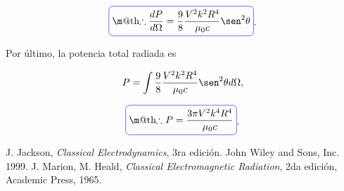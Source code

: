 \documentclass[a4paper,11pt]{article}
\makeatletter
\numberwithin{equation}{section}
\newcommand*{\boxcolor}{blue}
\renewcommand{\boxed}[1]{\textcolor{\boxcolor}{%
\tikz[baseline={([yshift=-1ex]current bounding box.center)}] \node [rectangle, minimum width=1ex,rounded corners,draw] {\normalcolor\m@th$\displaystyle#1$};}}
\makeatother
\begin{document}
\begin{equation}
 \boxed{\therefore \frac{dP}{d\Omega} = \frac{9}{8}\frac{V^2k^2R^4}{\mu_0c}
 \sen^2{\theta}}.
\end{equation}

Por último, la potencia total radiada es 

\begin{equation}
 P = \int  \frac{9}{8}\frac{V^2k^2R^4}{\mu_0c} \sen^2{\theta} d\Omega,
\end{equation}

\begin{equation}
 \boxed{\therefore P = \frac{3\pi V^2 k^4 R^4}{\mu_0 c}}.
\end{equation}

\begin{thebibliography}{10}
J. Jackson, \emph{Classical Electrodynamics}, 3ra edición. John Wiley and Sons, Inc. 
1999.
J. Marion, M. Heald, \emph{Classical Electromagnetic Radiation}, 2da edición, Academic 
Press, 1965.
\end{thebibliography}
\end{document}
